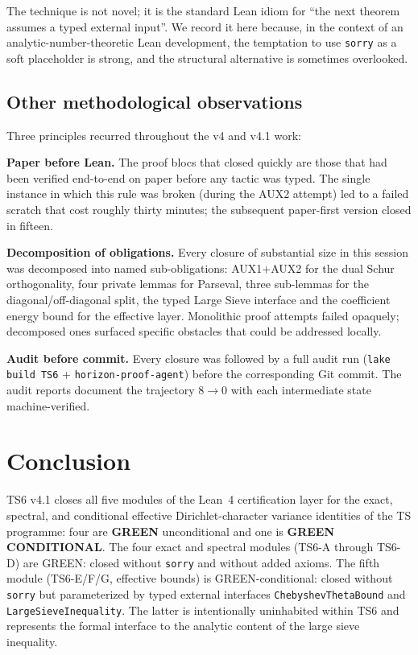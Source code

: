 \documentclass[11pt,a4paper]{article}
\theoremstyle{definition}
\newcommand{\GREEN}{\textcolor{green!50!black}{\textbf{GREEN}}}
\newcommand{\GREENC}{\textcolor{green!50!black}{\textbf{GREEN CONDITIONAL}}}
\begin{document}
The technique is not novel; it is the standard Lean idiom for ``the next theorem assumes a typed external input''. We record it here because, in the context of an analytic-number-theoretic Lean development, the temptation to use \texttt{sorry} as a soft placeholder is strong, and the structural alternative is sometimes overlooked.

\subsection{Other methodological observations}

Three principles recurred throughout the v4 and v4.1 work:

\textbf{Paper before Lean.} The proof blocs that closed quickly are those that had been verified end-to-end on paper before any tactic was typed. The single instance in which this rule was broken (during the AUX2 attempt) led to a failed scratch that cost roughly thirty minutes; the subsequent paper-first version closed in fifteen.

\textbf{Decomposition of obligations.} Every closure of substantial size in this session was decomposed into named sub-obligations: AUX1+AUX2 for the dual Schur orthogonality, four private lemmas for Parseval, three sub-lemmas for the diagonal/off-diagonal split, the typed Large Sieve interface and the coefficient energy bound for the effective layer. Monolithic proof attempts failed opaquely; decomposed ones surfaced specific obstacles that could be addressed locally.

\textbf{Audit before commit.} Every closure was followed by a full audit run (\verb|lake build TS6| + \verb|horizon-proof-agent|) before the corresponding Git commit. The audit reports document the trajectory $8 \to 0$ with each intermediate state machine-verified.

\section{Conclusion}\label{sec:conclusion}

TS6 v4.1 closes all five modules of the Lean~4 certification layer for the exact, spectral, and conditional effective Dirichlet-character variance identities of the TS programme: four are \GREEN{} unconditional and one is \GREENC{}. The four exact and spectral modules (TS6-A through TS6-D) are GREEN: closed without \texttt{sorry} and without added axioms. The fifth module (TS6-E/F/G, effective bounds) is GREEN-conditional: closed without \texttt{sorry} but parameterized by typed external interfaces \verb|ChebyshevThetaBound| and \verb|LargeSieveInequality|. The latter is intentionally uninhabited within TS6 and represents the formal interface to the analytic content of the large sieve inequality.
\end{document}
